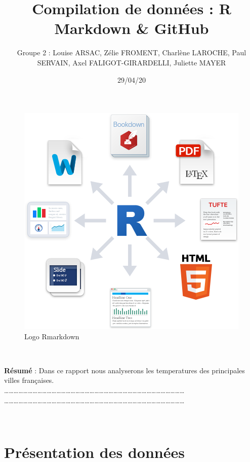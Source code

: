 \documentclass[
]{article}
\title{Compilation de données : R Markdown \& GitHub}
\author{Groupe 2 : Louise ARSAC, Zélie FROMENT, Charlène LAROCHE, Paul SERVAIN,
Axel FALIGOT-GIRARDELLI, Juliette MAYER}
\date{29/04/20}
\begin{document}
\maketitle

{
\setcounter{tocdepth}{3}
\tableofcontents
}
\begin{figure}[h]

{\centering \includegraphics[width=0.8\linewidth]{rmarkdown} 

}

\caption{Logo Rmarkdown}\label{fig:logo}
\end{figure}

~

\textbf{Résumé} : Dans ce rapport nous analyserons les temperatures des
principales villes françaises.\\
\ldots\ldots\ldots\ldots\ldots\ldots\ldots\ldots\ldots\ldots\ldots\ldots\ldots\ldots\ldots\ldots\ldots\ldots\ldots\ldots\ldots\ldots\ldots\ldots\ldots\ldots\ldots\ldots\ldots\ldots\ldots\ldots\ldots\ldots\ldots\ldots\ldots\ldots{}
\ldots\ldots\ldots\ldots\ldots\ldots\ldots\ldots\ldots\ldots\ldots\ldots\ldots\ldots\ldots\ldots\ldots\ldots\ldots\ldots\ldots\ldots\ldots\ldots\ldots\ldots\ldots\ldots\ldots\ldots\ldots\ldots\ldots\ldots\ldots\ldots\ldots\ldots{}

~

\hypertarget{pruxe9sentation-des-donnuxe9es}{%
\section{\texorpdfstring{\textbf{Présentation des données
}}{Présentation des données }}\label{pruxe9sentation-des-donnuxe9es}}
\end{document}
